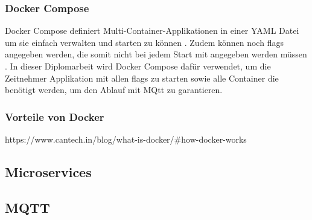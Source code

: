 \subsubsection{Docker Compose}
Docker Compose definiert Multi-Container-Applikationen in einer YAML Datei um sie einfach verwalten und starten zu können \cite{dev_to_docker_compose}. Zudem können noch flags angegeben werden, die somit nicht bei jedem Start mit angegeben werden müssen \cite{docker_what_is_docker_compose}. In dieser Diplomarbeit wird Docker Compose dafür verwendet, um die Zeitnehmer Applikation mit allen flags zu starten sowie alle Container die benötigt werden, um den Ablauf mit MQtt zu garantieren.


\subsubsection{Vorteile von Docker}
https://www.cantech.in/blog/what-is-docker/#how-docker-works

\subsection{Microservices}

\subsection{MQTT}
